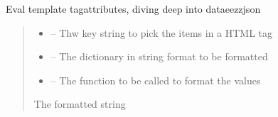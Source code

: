 \documentclass[letterpaper,10pt,english]{sphinxmanual}
\begin{document}
\begin{savenotes}
\begin{fulllineitems}

\begin{savenotes}\begin{fulllineitems}
\label{\detokenize{eezz:eezz.http_agent.THttpAgent.format_attributes}}
\pysigstartsignatures
{}
\pysigstopsignatures
\sphinxAtStartPar
Eval template tag\sphinxhyphen{}attributes, diving deep into data\sphinxhyphen{}eezz\sphinxhyphen{}json
\begin{quote}\begin{description}
\begin{itemize}
\item {} 
\sphinxAtStartPar
{} – Thw key string to pick the items in a HTML tag

\item {} 
\sphinxAtStartPar
{} – The dictionary in string format to be formatted

\item {} 
\sphinxAtStartPar
{} – The function to be called to format the values

\end{itemize}

\sphinxAtStartPar
The formatted string

\end{description}\end{quote}

\end{fulllineitems}\end{savenotes}



\end{fulllineitems}
\end{savenotes}
\end{document}
